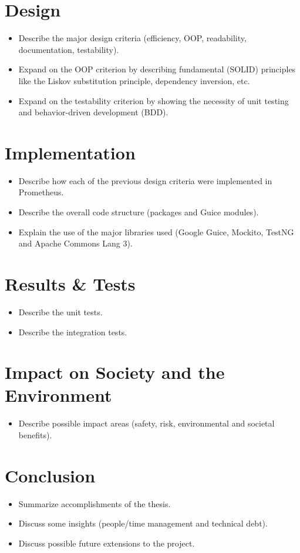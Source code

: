 \documentclass[11pt]{article}
\begin{document}
\section{Design}
\begin{itemize}
	\item Describe the major design criteria (efficiency, OOP, readability, documentation, testability).
	\item Expand on the OOP criterion by describing fundamental (SOLID) principles like the Liskov substitution principle, dependency inversion, etc.
	\item Expand on the testability criterion by showing the necessity of unit testing and behavior-driven development (BDD).
\end{itemize}

\section{Implementation}
\begin{itemize}
	\item Describe how each of the previous design criteria were implemented in Prometheus.
	\item Describe the overall code structure (packages and Guice modules).
	\item Explain the use of the major libraries used (Google Guice, Mockito, TestNG and Apache Commons Lang 3).
\end{itemize}

\section{Results \& Tests}
\begin{itemize}
	\item Describe the unit tests.
	\item Describe the integration tests.
\end{itemize}

\section{Impact on Society and the Environment}
\begin{itemize}
	\item Describe possible impact areas (safety, risk, environmental and societal benefits).
\end{itemize}

\section{Conclusion}
\begin{itemize}
	\item Summarize accomplishments of the thesis.
	\item Discuss some insights (people/time management and technical debt).
	\item Discuss possible future extensions to the project.
\end{itemize}
\end{document}
